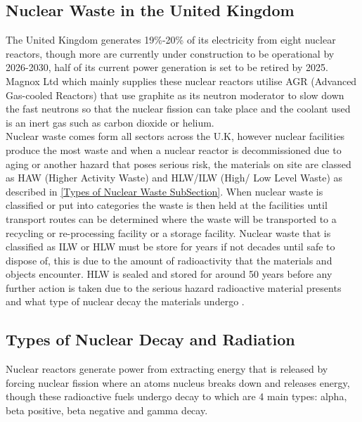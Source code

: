 \subsection{Nuclear Waste in the United Kingdom}
\label{Nuclear Waste in the United Kingdom SubSection}

The United Kingdom generates 19\%-20\% of its electricity from eight nuclear reactors, though more are currently under construction to be operational by 2026-2030, half of its current power generation is set to be retired by 2025. Magnox Ltd which mainly supplies these nuclear reactors utilise AGR (Advanced Gas-cooled Reactors) that use graphite as its neutron moderator to slow down the fast neutrons so that the nuclear fission can take place and the coolant used is an inert gas such as carbon dioxide or helium. \\

Nuclear waste comes form all sectors across the U.K, however nuclear facilities produce the most waste and when a nuclear reactor is decommissioned due to aging or another hazard that poses serious risk, the materials on site are classed as HAW (Higher Activity Waste) and HLW/ILW (High/ Low Level Waste) as described in \cref{Types of Nuclear Waste SubSection}. When nuclear waste is classified or put into categories the waste is then held at the facilities until transport routes can be determined where the waste will be transported to a recycling or re-processing facility or a storage facility. Nuclear waste that is classified as ILW or HLW must be store for years if not decades until safe to dispose of, this is due to the amount of radioactivity that the materials and objects encounter. HLW is sealed and stored for around 50 years before any further action is taken due to the serious hazard radioactive material presents and what type of nuclear decay the materials undergo \cite{ManageNuclearWaste}.

\subsection{Types of Nuclear Decay and Radiation}
\label{Types of Nuclear Decay SubSection}

Nuclear reactors generate power from extracting energy that is released by forcing nuclear fission where an atoms nucleus breaks down and releases energy, though these radioactive fuels undergo decay to which are 4 main types: alpha, beta positive, beta negative and gamma decay. 

